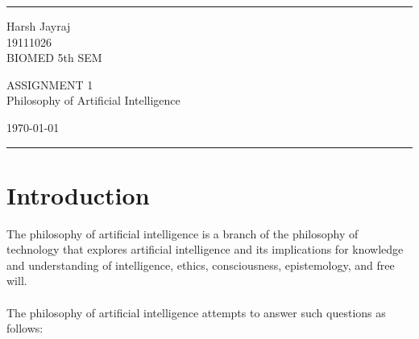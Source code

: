 \documentclass[a4paper]{article}
\begin{document}

\fancyhead[C]{}
\hrule \medskip %
\begin{minipage}{0.295\textwidth} 
\raggedright
\footnotesize
Harsh Jayraj\hfill\\   
19111026\hfill\\
BIOMED 5th SEM
\end{minipage}
\begin{minipage}{0.4\textwidth} 
\centering 
\large 
ASSIGNMENT 1\\
\normalsize 
Philosophy of Artificial Intelligence\\ 
\end{minipage}
\begin{minipage}{0.295\textwidth} 
\raggedleft
\today\hfill\\
\end{minipage}
\medskip\hrule 
\bigskip


\section{Introduction}
The philosophy of artificial intelligence is a branch of the philosophy of technology that explores artificial intelligence and its implications for knowledge and understanding of intelligence, ethics, consciousness, epistemology, and free will.
\\
\\
The philosophy of artificial intelligence attempts to answer such questions as follows:
\end{document}
